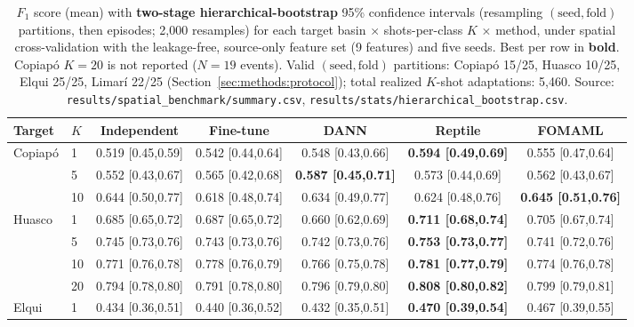 \begin{table}[ht]
    \centering
    \caption{$F_1$ score (mean) with \textbf{two-stage hierarchical-bootstrap} 95\% confidence intervals (resampling $(\text{seed},\text{fold})$ partitions, then episodes; 2{,}000 resamples) for each target basin $\times$ shots-per-class $K$ $\times$ method, under spatial cross-validation with the leakage-free, source-only feature set (9 features) and five seeds. Best per row in \textbf{bold}. Copiap\'o $K=20$ is not reported ($N=19$ events). Valid $(\text{seed},\text{fold})$ partitions: Copiap\'o 15/25, Huasco 10/25, Elqui 25/25, Limar\'i 22/25 (Section~\ref{sec:methods:protocol}); total realized $K$-shot adaptations: 5{,}460. Source: \texttt{results/spatial\_benchmark/summary.csv}, \texttt{results/stats/hierarchical\_bootstrap.csv}.}
    \label{tab:spatial_results}
    \footnotesize
    \begin{adjustbox}{max width=\textwidth}
    \begin{tabular}{llccccc}
        \toprule
        \textbf{Target} & \textbf{$K$} & \textbf{Independent} & \textbf{Fine-tune} & \textbf{DANN} & \textbf{Reptile} & \textbf{FOMAML} \\
        \midrule
        Copiap\'o  & 1  & 0.519 [0.45,0.59] & 0.542 [0.44,0.64] & 0.548 [0.43,0.66] & \textbf{0.594 [0.49,0.69]} & 0.555 [0.47,0.64] \\
                   & 5  & 0.552 [0.43,0.67] & 0.565 [0.42,0.68] & \textbf{0.587 [0.45,0.71]} & 0.573 [0.44,0.69] & 0.562 [0.43,0.67] \\
                   & 10 & 0.644 [0.50,0.77] & 0.618 [0.48,0.74] & 0.634 [0.49,0.77] & 0.624 [0.48,0.76] & \textbf{0.645 [0.51,0.76]} \\
        \midrule
        Huasco     & 1  & 0.685 [0.65,0.72] & 0.687 [0.65,0.72] & 0.660 [0.62,0.69] & \textbf{0.711 [0.68,0.74]} & 0.705 [0.67,0.74] \\
                   & 5  & 0.745 [0.73,0.76] & 0.743 [0.73,0.76] & 0.742 [0.73,0.76] & \textbf{0.753 [0.73,0.77]} & 0.741 [0.72,0.76] \\
                   & 10 & 0.771 [0.76,0.78] & 0.778 [0.76,0.79] & 0.766 [0.75,0.78] & \textbf{0.781 [0.77,0.79]} & 0.774 [0.76,0.78] \\
                   & 20 & 0.794 [0.78,0.80] & 0.791 [0.78,0.80] & 0.796 [0.79,0.80] & \textbf{0.808 [0.80,0.82]} & 0.799 [0.79,0.81] \\
        \midrule
        Elqui      & 1  & 0.434 [0.36,0.51] & 0.440 [0.36,0.52] & 0.432 [0.35,0.51] & \textbf{0.470 [0.39,0.54]} & 0.467 [0.39,0.55] \\

\end{tabular}
\end{adjustbox}
\end{table}
